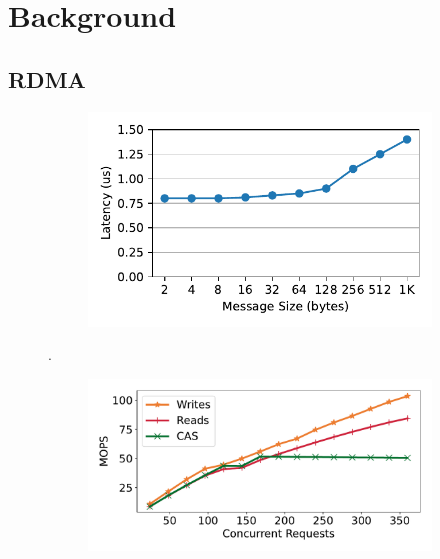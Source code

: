 \section{Background}
\label{sec:background}

\subsection{RDMA}

\begin{figure}[t]
    \centering
    \begin{subfigure}{0.3\linewidth}
        \includegraphics[width=0.99\linewidth]{fig/rdma_latency.pdf}
        \label{fig:rdma_latency}
    \end{subfigure}.
    \begin{subfigure}{0.3\linewidth}
        \includegraphics[width=0.99\linewidth]{fig/rdma_concur.pdf}
    \end{subfigure}
    \begin{subfigure}{0.3\linewidth}

\end{subfigure}
\end{figure}
